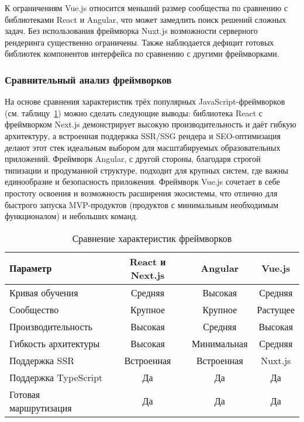 К ограничениям Vue.js относится меньший размер сообщества по сравнению с библиотеками React и Angular, что может замедлить поиск решений сложных задач. Без использования фреймворка Nuxt.js возможности серверного рендеринга существенно ограничены. Также наблюдается дефицит готовых библиотек компонентов интерфейса по сравнению с другими фреймворками.

\subsubsection{Сравнительный анализ фреймворков}

На основе сравнения характеристик трёх популярных JavaScript-фреймворков (см. таблицу~\ref{tab:framework-comparison}) можно сделать следующие выводы: библиотека React с фреймворком Next.js демонстрирует высокую производительность и даёт гибкую архитектуру, а встроенная поддержка SSR/SSG рендера и SEO-оптимизация делают этот стек идеальным выбором для масштабируемых образовательных приложений. Фреймворк Angular, с другой стороны, благодаря строгой типизации и продуманной структуре, подходит для крупных систем, где важны единообразие и безопасность приложения. Фреймворк Vue.js сочетает в себе простоту освоения и возможность расширения экосистемы, что отлично для быстрого запуска MVP-продуктов (продуктов с минимальным необходимым функционалом) и небольших команд.

\begin{table}[h]
  \small
  \centering
  \caption{Сравнение характеристик фреймворков}
  \label{tab:framework-comparison}
  \begin{tabular}{|l|c|c|c|}
  	\hline
  	\textbf{Параметр}     & React и Next.js &   Angular   &  Vue.js  \\ \hline
  	Кривая обучения       &     Средняя     &   Высокая   & Средняя  \\ \hline
  	Сообщество            &     Крупное     &   Крупное   & Растущее \\ \hline
  	Производительность    &     Высокая     &   Средняя   & Высокая  \\ \hline
  	Гибкость архитектуры  &     Высокая     & Минимальная & Средняя  \\ \hline
  	Поддержка SSR         &   Встроенная    & Встроенная  & Nuxt.js  \\ \hline
  	Поддержка TypeScript  &       Да        &     Да      &    Да    \\ \hline
  	Готовая маршрутизация &       Да        &     Да      &    Да    \\ \hline
  \end{tabular}
\end{table}

